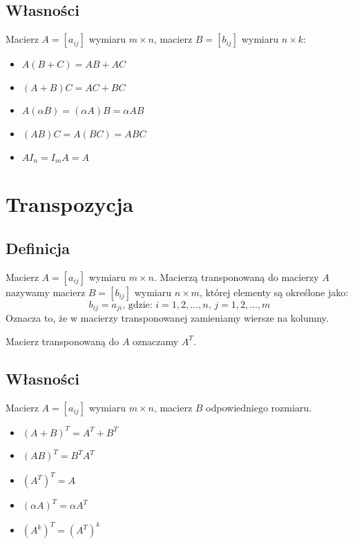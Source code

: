 \documentclass{article}
\begin{document}
\subsection{Własności}
Macierz $A = [a_{ij}]$ wymiaru $m \times n$, macierz $B=[b_{ij}]$
wymiaru $n \times k$:
\begin{itemize}
    \item $A(B+C) = AB + AC$
    \item $(A+B)C = AC + BC$
    \item $A(\alpha B) = (\alpha A)B = \alpha AB$
    \item $(AB)C = A(BC) = ABC$
    \item $AI_{n} = I_{m}A = A$
\end{itemize}

\section{Transpozycja}
\subsection{Definicja}
Macierz $A = [a_{ij}]$ wymiaru $m \times n$.
Macierzą transponowaną do macierzy $A$ nazywamy macierz $B=[b_{ij}]$
wymiaru $n \times m$, której elementy są określone jako:
$$
    b_{ij} = a_{ji}, \, \text{gdzie: } i = 1,2, \dots , n,\,
    j=1,2, \dots, m
$$
Oznacza to, że w macierzy transponowanej zamieniamy wiersze na kolumny.

Macierz transponowaną do $A$ oznaczamy $A^{T}$.
\subsection{Własności}
Macierz $A = [a_{ij}]$ wymiaru $m \times n$, macierz $B$ odpowiedniego
rozmiaru.
\begin{itemize}
    \item $(A+B)^{T} = A^{T} + B^{T}$
    \item $(AB)^{T} = B^{T}A^{T}$
    \item $(A^{T})^{T} = A$
    \item $(\alpha A)^{T} = \alpha A^{T}$
    \item $(A^{k})^{T} = (A^{T})^{k}$
\end{itemize}

\end{document}
